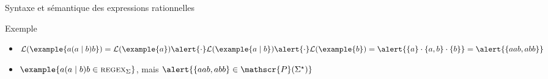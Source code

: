 \begin{frame}{Syntaxe et sémantique des expressions rationnelles}
  \vspace{-2mm}
  \begin{exampleblock}{Exemple}
  \begin{itemize}
    \item\vspace{-1mm} $\mathcal{L}(\example{a (a \mid b) b}) = \mathcal{L}(\example{a}) \alert{\cdot} \mathcal{L}(\example{a \mid b}) \alert{\cdot} \mathcal{L}(\example{b}) = \alert{\{a\} \cdot \{a, b\} \cdot \{b\}}  = \alert{\{aab, abb\}}$
    \item $\example{a (a \mid b) b \in \textsc{regex}_\Sigma}$, mais $\alert{\{aab, abb\} \in \mathscr{P}(\Sigma^\star)}$
    \end{itemize}
  \end{exampleblock}
 
\end{frame}

\endgroup
\endinput
